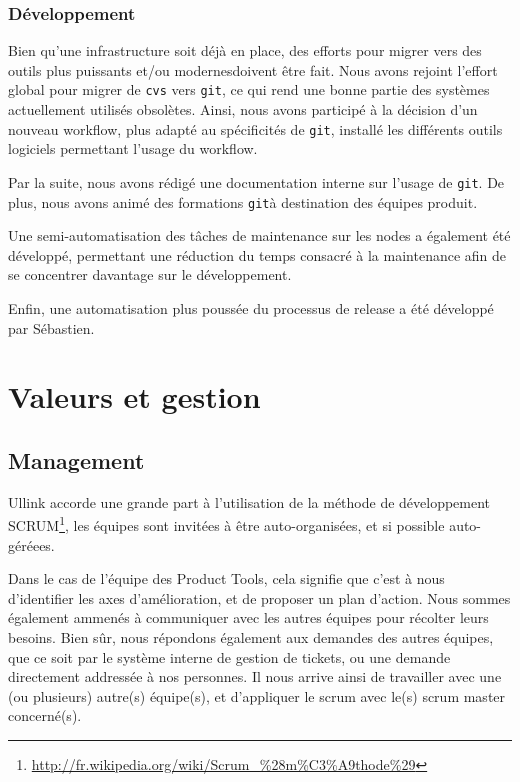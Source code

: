 \documentclass[a4paper, 12pt]{article}
\newcommand{\git}{\texttt{git}}
\begin{document}
\subsubsection{Développement}

Bien qu'une infrastructure soit déjà en place, des efforts pour migrer vers des outils plus puissants et/ou modernesdoivent être fait. Nous avons rejoint l'effort global pour migrer de \texttt{cvs} vers \git, ce qui rend une bonne partie des systèmes actuellement utilisés obsolètes. Ainsi, nous avons participé à la décision d'un nouveau workflow, plus adapté au spécificités de \git, installé les différents outils logiciels permettant l'usage du workflow.

Par la suite, nous avons rédigé une documentation interne sur l'usage de \git. De plus, nous avons animé des formations \git à destination des équipes produit.

Une semi-automatisation des tâches de maintenance sur les nodes a également été développé, permettant une réduction du temps consacré à la maintenance afin de se concentrer davantage sur le développement.

Enfin, une automatisation plus poussée du processus de release a été développé par Sébastien.

\section{Valeurs et gestion}

\subsection{Management}

Ullink accorde une grande part à l'utilisation de la méthode de développement SCRUM\footnote{\url{http://fr.wikipedia.org/wiki/Scrum_\%28m\%C3\%A9thode\%29}}, les équipes sont invitées à être auto-organisées, et si possible auto-géréees.

Dans le cas de l'équipe des Product Tools, cela signifie que c'est à nous d'identifier les axes d'amélioration, et de proposer un plan d'action. Nous sommes également ammenés à communiquer avec les autres équipes pour récolter leurs besoins. Bien sûr, nous répondons également aux demandes des autres équipes, que ce soit par le système interne de gestion de tickets, ou une demande directement addressée à nos personnes. Il nous arrive ainsi de travailler avec une (ou plusieurs) autre(s) équipe(s), et d'appliquer le scrum avec le(s) scrum master concerné(s).
\end{document}
